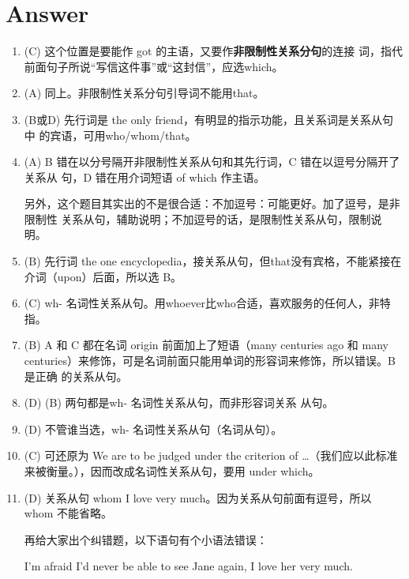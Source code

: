 \section{Answer}
\begin{enumerate}
\item (C) 这个位置是要能作 got 的主语，又要作\textbf{非限制性关系分句}的连接
  词，指代前面句子所说“写信这件事”或“这封信”，应选which。

\item (A) 同上。非限制性关系分句引导词不能用that。

\item (B或D) 先行词是 the only friend，有明显的指示功能，且关系词是关系从句中
  的宾语，可用who/whom/that。

\item (A) B 错在以分号隔开非限制性关系从句和其先行词，C 错在以逗号分隔开了关系从
  句，D 错在用介词短语 of which 作主语。

  另外，这个题目其实出的不是很合适：不加逗号：可能更好。加了逗号，是非限制性
  关系从句，辅助说明；不加逗号的话，是限制性关系从句，限制说明。

\item (B) 先行词 the one encyclopedia，接关系从句，但that没有宾格，不能紧接在
  介词（upon）后面，所以选 B。

\item (C) wh- 名词性关系从句。用whoever比who合适，喜欢服务的任何人，非特指。

\item (B) A 和 C 都在名词 origin 前面加上了短语（many centuries ago 和 many
  centuries）来修饰，可是名词前面只能用单词的形容词来修饰，所以错误。B 是正确
  的关系从句。

\item {} (D)  (B) 两句都是wh- 名词性关系从句，而非形容词关系
  从句。

\item (D) 不管谁当选，wh- 名词性关系从句（名词从句）。


\item (C) 可还原为 We are to be judged under the criterion of
  \ldots（我们应以此标准来被衡量。），因而改成名词性关系从句，要用 under which。


\item (D) 关系从句 whom I love very much。因为关系从句前面有逗号，所以 whom
  不能省略。

  再给大家出个纠错题，以下语句有个小语法错误：

  I'm afraid I'd never be able to see Jane again, I love her very much.


\end{enumerate}
